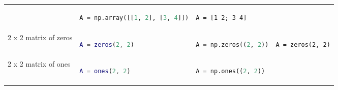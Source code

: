 \documentclass[10pt, landscape]{article}
\begin{document}
\begin{multicols}{2}
\begin{tabular}[]{@{}llll@{}}
\begin{minipage}[t]{0.20\columnwidth}
\end{minipage} & \begin{minipage}[t]{0.25\columnwidth}\raggedright
\begin{lstlisting}[language=Python]
A = np.array([[1, 2], [3, 4]])
\end{lstlisting}

\end{minipage} & \begin{minipage}[t]{0.20\columnwidth}\raggedright
\begin{lstlisting}
A = [1 2; 3 4]
\end{lstlisting}

\end{minipage}\tabularnewline
\begin{minipage}[t]{0.24\columnwidth}\raggedright
2 x 2 matrix of zeros
\end{minipage} & \begin{minipage}[t]{0.20\columnwidth}\raggedright
\begin{lstlisting}[language=Matlab]
A = zeros(2, 2)
\end{lstlisting}

\end{minipage} & \begin{minipage}[t]{0.25\columnwidth}\raggedright
\begin{lstlisting}[language=Python]
A = np.zeros((2, 2))
\end{lstlisting}

\end{minipage} & \begin{minipage}[t]{0.20\columnwidth}\raggedright
\begin{lstlisting}
A = zeros(2, 2)
\end{lstlisting}

\end{minipage}\tabularnewline
\begin{minipage}[t]{0.24\columnwidth}\raggedright
2 x 2 matrix of ones
\end{minipage} & \begin{minipage}[t]{0.20\columnwidth}\raggedright
\begin{lstlisting}[language=Matlab]
A = ones(2, 2)
\end{lstlisting}

\end{minipage} & \begin{minipage}[t]{0.25\columnwidth}\raggedright
\begin{lstlisting}[language=Python]
A = np.ones((2, 2))
\end{lstlisting}


\end{minipage}
\end{tabular}
\end{multicols}
\end{document}
